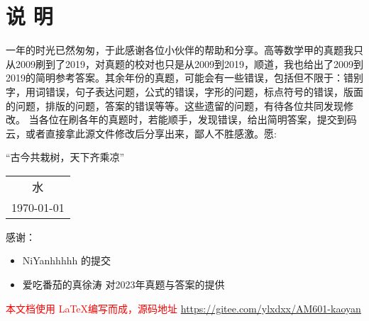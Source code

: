 




\chapter*{说 \quad 明}
\thispagestyle{empty}




一年的时光已然匆匆，于此感谢各位小伙伴的帮助和分享。高等数学甲的真题我只从2009刷到了2019，对真题的校对也只是从2009到2019，顺道，我也给出了2009到2019的简明参考答案。其余年份的真题，可能会有一些错误，包括但不限于：错别字，用词错误，句子表达问题，公式的错误，字形的问题，标点符号的错误，版面的问题，排版的问题，答案的错误等等。这些遗留的问题，有待各位共同发现修改。
当各位在刷各年的真题时，若能顺手，发现错误，给出简明答案，提交到码云，或者直接拿此源文件修改后分享出来，鄙人不胜感激。愿:
\begin{center}
	\kaishu 
	“古今共栽树，天下齐乘凉”
\end{center}
\begin{center}
	\flushright
	\begin{tabular}{c}
		水   \\
		\today
	\end{tabular}	
\end{center}


\vfil
\noindent
{感谢：}
\begin{itemize}
\item 
NiYanhhhhh 的提交
\item 
爱吃番茄的真徐涛 对2023年真题与答案的提供
\end{itemize}
\vfil
\noindent
\textcolor{red}{本文档使用 \LaTeX 编写而成，源码地址 \url{https://gitee.com/ylxdxx/AM601-kaoyan}  }
\vfil


\pagestyle{mypagestyle}

